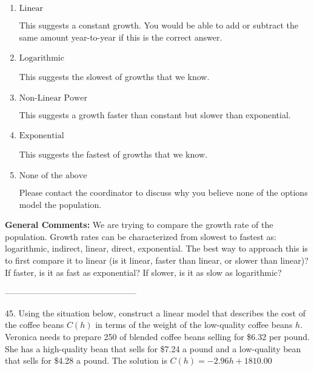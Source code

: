 \documentclass{extbook}[14pt]
\begin{document}
\begin{enumerate}[label=\Alph*.] 
\item $ \text{Linear} $ 

 This suggests a constant growth. You would be able to add or subtract the same amount year-to-year if this is the correct answer. 
\item $ \text{Logarithmic} $ 

 This suggests the slowest of growths that we know. 
\item $ \text{Non-Linear Power} $ 

 This suggests a growth faster than constant but slower than exponential. 
\item $ \text{Exponential} $ 

 This suggests the fastest of growths that we know. 
\item $ \text{None of the above} $ 

 Please contact the coordinator to discuss why you believe none of the options model the population. 
\end{enumerate} 
 
\textbf{General Comments:} We are trying to compare the growth rate of the population. Growth rates can be characterized from slowest to fastest as: logarithmic, indirect, linear, direct, exponential. The best way to approach this is to first compare it to linear (is it linear, faster than linear, or slower than linear)? If faster, is it as fast as exponential? If slower, is it as slow as logarithmic?

-----------------------------------------------

45. Using the situation below, construct a linear model that describes the cost of the coffee beans $C(h)$ in terms of the weight of the low-quality coffee beans $h$.
Veronica needs to prepare 250 of blended coffee beans selling for \$6.32 per pound. She has a high-quality bean that sells for \$7.24 a pound and a low-quality bean that sells for \$4.28 a pound. 
The solution is $ C(h) = -2.96 h + 1810.00 $ 
\end{document}
